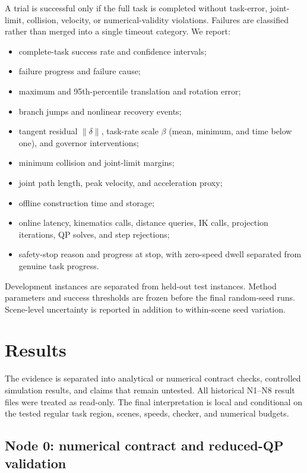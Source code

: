 \documentclass[preprint,12pt]{elsarticle}
\begin{document}
A trial is successful only if the full task is completed without task-error, joint-limit, collision, velocity, or numerical-validity violations. Failures are classified rather than merged into a single timeout category. We report:
\begin{itemize}
    \item complete-task success rate and confidence intervals;
    \item failure progress and failure cause;
    \item maximum and 95th-percentile translation and rotation error;
    \item branch jumps and nonlinear recovery events;
    \item tangent residual $\|\delta\|$, task-rate scale $\beta$ (mean, minimum, and time below one), and governor interventions;
    \item minimum collision and joint-limit margins;
    \item joint path length, peak velocity, and acceleration proxy;
    \item offline construction time and storage;
    \item online latency, kinematics calls, distance queries, IK calls, projection iterations, QP solves, and step rejections;
    \item safety-stop reason and progress at stop, with zero-speed dwell separated from genuine task progress.
\end{itemize}

Development instances are separated from held-out test instances. Method parameters and success thresholds are frozen before the final random-seed runs. Scene-level uncertainty is reported in addition to within-scene seed variation.

\section{Results}
\label{sec:results}

The evidence is separated into analytical or numerical contract checks, controlled simulation results, and claims that remain untested. All historical N1--N8 result files were treated as read-only. The final interpretation is local and conditional on the tested regular task region, scenes, speeds, checker, and numerical budgets.

\subsection{Node 0: numerical contract and reduced-QP validation}
\end{document}
